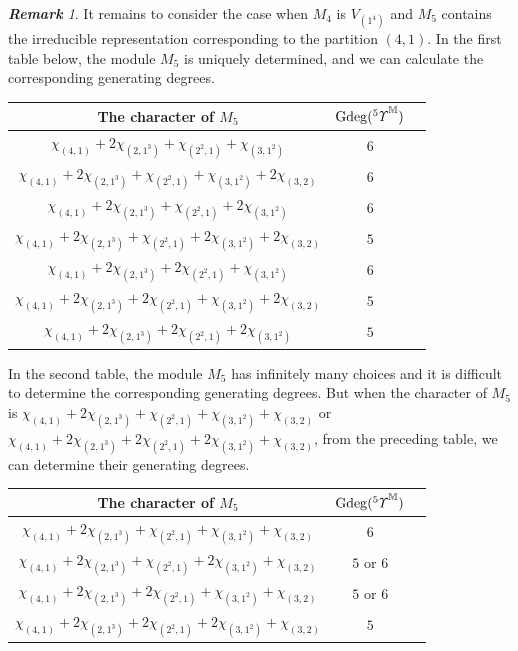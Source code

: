 \documentclass{amsart}
\theoremstyle{definition}
\theoremstyle{remark}
\newtheorem{rmk}[thm]{\bf Remark}
\numberwithin{equation}{section}
\def\gd{\operatorname{Gdeg}}
\newcommand{\upa}[1]{{^{#1}{\it \!\Upsilon}}}
\begin{document}
\begin{rmk}
\label{yyrem5.14}
It remains to consider the case when $M_4$ is $V_{(1^4)}$ and  
$M_5$  contains the irreducible representation corresponding 
to the partition $(4,1)$. In the first table below, the module 
$M_5$ is uniquely determined, and we  can calculate the 
corresponding generating degrees.		
\begin{center}	
\begin{tabular}{|c|c|c|}
\hline
The character of $ M_5$                                                       
&$\gd(\upa{5}^{\mathbb M})$ \\ 
\hline 
$\chi_{(4,1)}+2\chi_{(2,1^3)}+\chi_{(2^2,1)}+\chi_{(3,1^2)}$                  
& $6$ \\ 
\hline			 
$\chi_{(4,1)}+2\chi_{(2,1^3)}+\chi_{(2^2,1)}+\chi_{(3,1^2)}+2\chi_{(3,2)}$    
& $6$ \\ 
\hline
$\chi_{(4,1)}+2\chi_{(2,1^3)}+\chi_{(2^2,1)}+2\chi_{(3,1^2)}$                 
& $6$ \\ 
\hline
$\chi_{(4,1)}+2\chi_{(2,1^3)}+\chi_{(2^2,1)}+2\chi_{(3,1^2)}+2\chi_{(3,2)}$   
& $5$\\ 
\hline
$\chi_{(4,1)}+2\chi_{(2,1^3)}+2\chi_{(2^2,1)}+\chi_{(3,1^2)}$                 
& $6$ \\ 
\hline
$\chi_{(4,1)}+2\chi_{(2,1^3)}+2\chi_{(2^2,1)}+\chi_{(3,1^2)}+2\chi_{(3,2)}$   
& $5$ \\ 
\hline
$\chi_{(4,1)}+2\chi_{(2,1^3)}+2\chi_{(2^2,1)}+2\chi_{(3,1^2)}$                
& $5$  \\ 
\hline		
\end{tabular}
\end{center}
\end{rmk}

In the second table,  the module $M_5$ has infinitely many choices 
and it is difficult to determine the corresponding generating 
degrees. But when the character of $M_5$ is 
$\chi_{(4,1)}+2\chi_{(2,1^3)}+\chi_{(2^2,1)}+\chi_{(3,1^2)}
+\chi_{(3,2)}$ or 
$\chi_{(4,1)}+2\chi_{(2,1^3)}+2\chi_{(2^2,1)}+2\chi_{(3,1^2)}
+\chi_{(3,2)}$, from the preceding table, we can determine 
their generating degrees.

\begin{center}	
\begin{tabular}{|c|c|c|}
\hline
The character of $ M_5$                                                       
&$\gd(\upa{5}^{\mathbb M})$ \\ 
\hline 
$\chi_{(4,1)}+2\chi_{(2,1^3)}+\chi_{(2^2,1)}+\chi_{(3,1^2)}+\chi_{(3,2)}$     
& $6$ \\ 
\hline
$\chi_{(4,1)}+2\chi_{(2,1^3)}+\chi_{(2^2,1)}+2\chi_{(3,1^2)}+\chi_{(3,2)}$    
& $5$ or $6$ \\ 
\hline
$\chi_{(4,1)}+2\chi_{(2,1^3)}+2\chi_{(2^2,1)}+\chi_{(3,1^2)}+\chi_{(3,2)}$    
& $5$ or $6$ \\ 
\hline
$\chi_{(4,1)}+2\chi_{(2,1^3)}+2\chi_{(2^2,1)}+2\chi_{(3,1^2)}+\chi_{(3,2)}$   
& $5$ \\ 
\hline			
\end{tabular}
\end{center}
\end{document}
